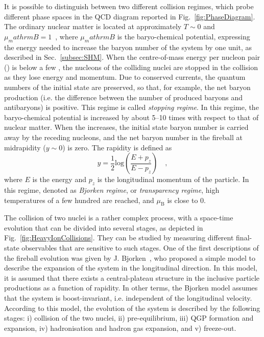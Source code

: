 It is possible to distinguish between two different collision regimes, which probe different phase spaces in the QCD diagram reported in Fig.~\ref{fig:PhaseDiagram}. The ordinary nuclear matter is located at approximately $T\sim0$ and $\mu_mathrm{B}=1$~\gev, where $\mu_mathrm{B}$ is the baryo-chemical potential, expressing the energy needed to increase the baryon number of the system by one unit, as described in Sec.~\ref{subsec:SHM}. When the centre-of-mass energy per nucleon pair (\snn) is below a few \gev, the nucleons of the colliding nuclei are stopped in the collision as they lose energy and momentum. Due to conserved currents, the quantum numbers of the initial state are preserved, so that, for example, the net baryon production (i.e. the difference between the number of produced baryons and antibaryons) is positive. This regime is called \emph{stopping regime}. In this regime, the baryo-chemical potential is increased by about 5--10 times with respect to that of nuclear matter. When the \snn increases, the initial state baryon number is carried away by the receding nucleons, and the net baryon number in the fireball at midrapidity ($y\sim0$) is zero. The rapidity is defined as 
\begin{equation*}
    y = \frac{1}{2}\mathrm{log}\left(\frac{E+p_z}{E-p_z}\right)\quad ,
\end{equation*}
where $E$ is the energy and $p_z$ is the longitudinal momentum of the particle. In this regime, denoted as \emph{Bjorken regime}, or \emph{transparency regime}, high temperatures of a few hundred \mev are reached, and $\mu_\mathrm{B}$ is close to 0.   

The collision of two nuclei is a rather complex process, with a space-time evolution that can be divided into several stages, as depicted in Fig.~\ref{fig:HeavyIonCollisions}. They can be studied by measuring different final-state observables that are sensitive to such stages. One of the first descriptions of the fireball evolution was given by J. Bjorken~\cite{Bjorken:1982qr}, who proposed a simple model to describe the expansion of the system in the longitudinal direction. In this model, it is assumed that there exists a central-plateau structure in the inclusive particle productions as a function of rapidity. In other terms, the Bjorken model assumes that the system is boost-invariant, i.e. independent of the longitudinal velocity. According to this model, the evolution of the system is described by the following stages: i) collision of the two nuclei, ii) pre-equilibrium, iii) QGP formation and expansion, iv) hadronisation and hadron gas expansion, and v) freeze-out.

